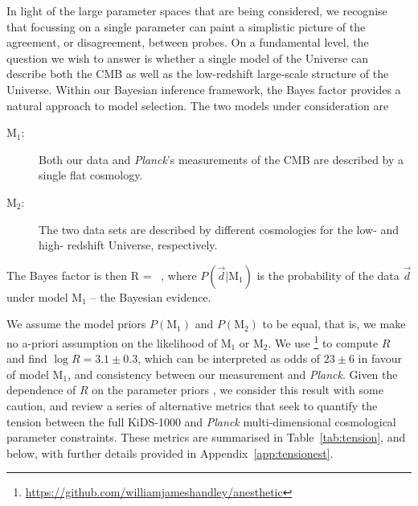 In light of the large parameter spaces that are being considered, we recognise that focussing on a single parameter can paint a simplistic picture of the agreement, or disagreement, between probes.
On a fundamental level, the question we wish to answer is whether a single model of the Universe can describe both the CMB as well as the low-redshift large-scale structure of the Universe.
Within our Bayesian inference framework, the Bayes factor provides a natural approach to model selection. 
The two models under consideration are 
\begin{description}
	\item[$\mathrm{M}_1$:] Both our \tttp data and {\it Planck}'s measurements of the CMB are described by a single flat \LCDM cosmology.
	\item[$\mathrm{M}_2$:] The two data sets are described by different cosmologies for the low- and high- redshift Universe, respectively.
\end{description}
The Bayes factor is then
\be
\label{equ:bayes-factor}
	R =  \ ,
\ee
where $P(\vec d | \mathrm{M}_1)$ is the probability of the data $\vec d$ under model $\mathrm{M}_1$ -- the Bayesian evidence. 

We assume the model priors $P(\mathrm{M}_1)$ and $P(\mathrm{M}_2)$ to be equal, that is, we make no a-priori assumption on the likelihood of $\mathrm{M}_1$ or $\mathrm{M}_2$. 
We use \footnote{\url{https://github.com/williamjameshandley/anesthetic}}\citep{anesthetic} to compute $R$ and find $\log R=3.1\pm0.3$, which can be interpreted as odds of $23\pm6$ in favour of model $\mathrm{M}_1$, and consistency between our \tttp measurement and {\it Planck}.  Given the dependence of $R$ on the parameter priors \citep{handley/lemos:2019}, we consider this result with some caution, and review a series of alternative metrics that seek to quantify the tension between the full KiDS-1000 and {\it Planck} multi-dimensional cosmological parameter constraints.   These metrics are summarised in Table~\ref{tab:tension}, and below, with further details provided in Appendix~\ref{app:tensionest}.

